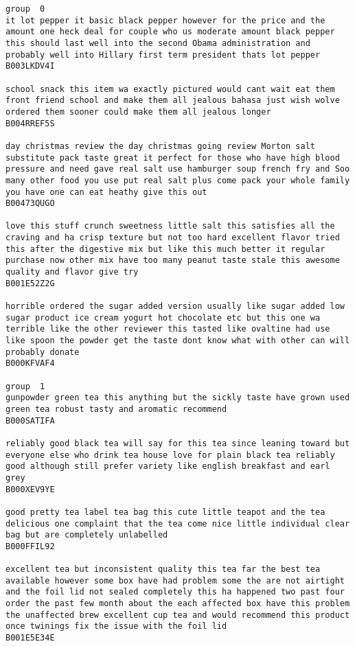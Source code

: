 \documentclass[11pt]{article}
\begin{document}
    \begin{Verbatim}[commandchars=\\\{\}]
group  0
it lot pepper it basic black pepper however for the price and the amount one heck deal for couple who us moderate amount black pepper this should last well into the second Obama administration and probably well into Hillary first term president thats lot pepper
B003LKDV4I

school snack this item wa exactly pictured would cant wait eat them front friend school and make them all jealous bahasa just wish wolve ordered them sooner could make them all jealous longer
B004RREF5S

day christmas review the day christmas going review Morton salt substitute pack taste great it perfect for those who have high blood pressure and need gave real salt use hamburger soup french fry and Soo many other food you use put real salt plus come pack your whole family you have one can eat heathy give this out
B00473QUGO

love this stuff crunch sweetness little salt this satisfies all the craving and ha crisp texture but not too hard excellent flavor tried this after the digestive mix but like this much better it regular purchase now other mix have too many peanut taste stale this awesome quality and flavor give try
B001E52Z2G

horrible ordered the sugar added version usually like sugar added low sugar product ice cream yogurt hot chocolate etc but this one wa terrible like the other reviewer this tasted like ovaltine had use like spoon the powder get the taste dont know what with other can will probably donate
B000KFVAF4

group  1
gunpowder green tea this anything but the sickly taste have grown used green tea robust tasty and aromatic recommend
B000SATIFA

reliably good black tea will say for this tea since leaning toward but everyone else who drink tea house love for plain black tea reliably good although still prefer variety like english breakfast and earl grey
B000XEV9YE

good pretty tea label tea bag this cute little teapot and the tea delicious one complaint that the tea come nice little individual clear bag but are completely unlabelled
B000FFIL92

excellent tea but inconsistent quality this tea far the best tea available however some box have had problem some the are not airtight and the foil lid not sealed completely this ha happened two past four order the past few month about the each affected box have this problem the unaffected brew excellent cup tea and would recommend this product once twinings fix the issue with the foil lid
B001E5E34E


\end{Verbatim}
\end{document}
